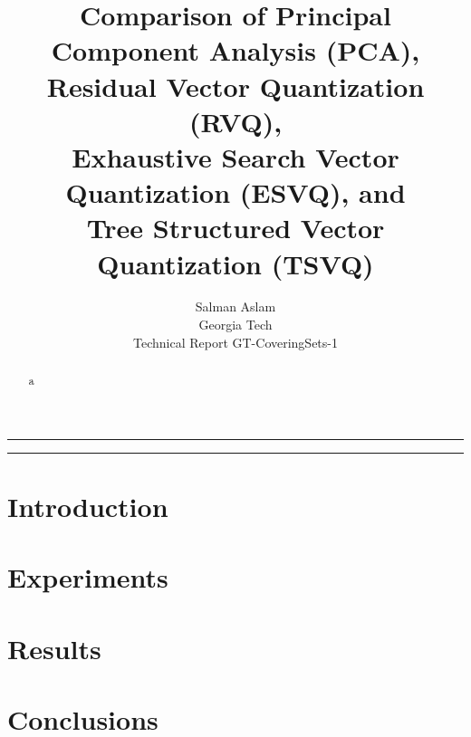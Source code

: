 \documentclass[12pt]{article}
\author{Salman Aslam\\Georgia Tech\\Technical Report GT-CoveringSets-1}
\title{Comparison of Principal Component Analysis (PCA), \\ Residual Vector Quantization (RVQ), \\Exhaustive Search Vector Quantization (ESVQ), and \\ Tree Structured Vector Quantization (TSVQ)}
\begin{document}
\maketitle
\rule[0pt]{\textwidth}{1pt}
\tableofcontents
\rule[0pt]{\textwidth}{1pt}

\begin{abstract}
a
\end{abstract}


\section{Introduction}


\section{Experiments}

\section{Results}


\section{Conclusions}

      
                    





\appendix
\end{document}
